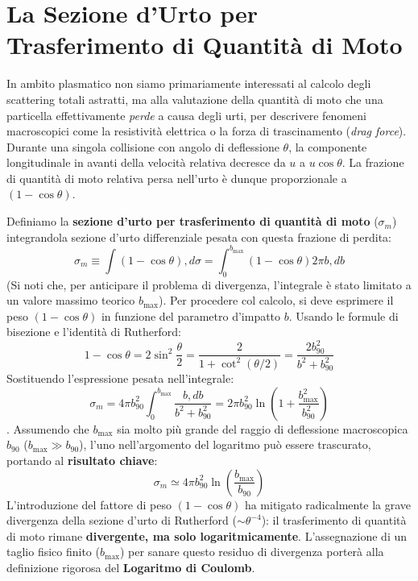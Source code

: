\section{La Sezione d'Urto per Trasferimento di Quantità di Moto}

In ambito plasmatico non siamo primariamente interessati al calcolo degli scattering totali astratti, ma alla valutazione della quantità di moto che una particella effettivamente \textit{perde} a causa degli urti, per descrivere fenomeni macroscopici come la resistività elettrica o la forza di trascinamento (\textit{drag force}).
Durante una singola collisione con angolo di deflessione $\theta$, la componente longitudinale in avanti della velocità relativa decresce da $u$ a $u \cos\theta$. La frazione di quantità di moto relativa persa nell'urto è dunque proporzionale a $(1 - \cos\theta)$.

Definiamo la \textbf{sezione d'urto per trasferimento di quantità di moto} ($\sigma_m$) integrandola sezione d'urto differenziale pesata con questa frazione di perdita:
\begin{equation}
\sigma_m \equiv \int (1 - \cos\theta) , d\sigma = \int_0^{b_{\text{max}}} (1 - \cos\theta) 2\pi b , db
\end{equation}
(Si noti che, per anticipare il problema di divergenza, l'integrale è stato limitato a un valore massimo teorico $b_{\text{max}}$).
Per procedere col calcolo, si deve esprimere il peso $(1 - \cos\theta)$ in funzione del parametro d'impatto $b$. Usando le formule di bisezione e l'identità di Rutherford:
\begin{equation}
1 - \cos\theta = 2 \sin^2\frac{\theta}{2} = \frac{2}{1 + \cot^2(\theta/2)} = \frac{2 b_{90}^2}{b^2 + b_{90}^2}
\end{equation}
Sostituendo l'espressione pesata nell'integrale:
\begin{equation}
\sigma_m = 4\pi b_{90}^2 \int_0^{b_{\text{max}}} \frac{b , db}{b^2 + b_{90}^2} = 2\pi b_{90}^2 \ln\left( 1 + \frac{b_{\text{max}}^2}{b_{90}^2} \right)
\end{equation}
.
Assumendo che $b_{\text{max}}$ sia molto più grande del raggio di deflessione macroscopica $b_{90}$ ($b_{\text{max}} \gg b_{90}$), l'uno nell'argomento del logaritmo può essere trascurato, portando al \textbf{risultato chiave}:
\begin{equation}
\sigma_m \simeq 4\pi b_{90}^2 \ln\left(\frac{b_{\text{max}}}{b_{90}}\right)
\end{equation}
L'introduzione del fattore di peso $(1 - \cos\theta)$ ha mitigato radicalmente la grave divergenza della sezione d'urto di Rutherford ($\sim \theta^{-4}$): il trasferimento di quantità di moto rimane \textbf{divergente, ma solo logaritmicamente}. L'assegnazione di un taglio fisico finito ($b_{\text{max}}$) per sanare questo residuo di divergenza porterà alla definizione rigorosa del \textbf{Logaritmo di Coulomb}.

